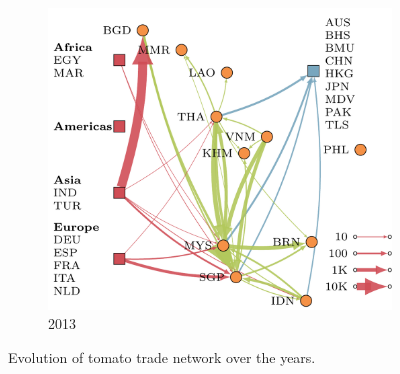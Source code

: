 \documentclass[10pt]{article}
\theoremstyle{definition}
\newcommand{\mooreRange}{r_\mathrm{M}}
\begin{document}
\begin{figure}[!ht]
\begin{subfigure}[b]{.32\textwidth}
\end{subfigure}
\begin{subfigure}[b]{.32\textwidth}
    \includegraphics[width=\textwidth]{../international_trade/results/network_plots/sea_2013_tomato.pdf}
    \caption{2013}
\end{subfigure}
\caption{Evolution of tomato trade network over the years.}
\label{fig:tradeYears}
\end{figure}
\end{document}
